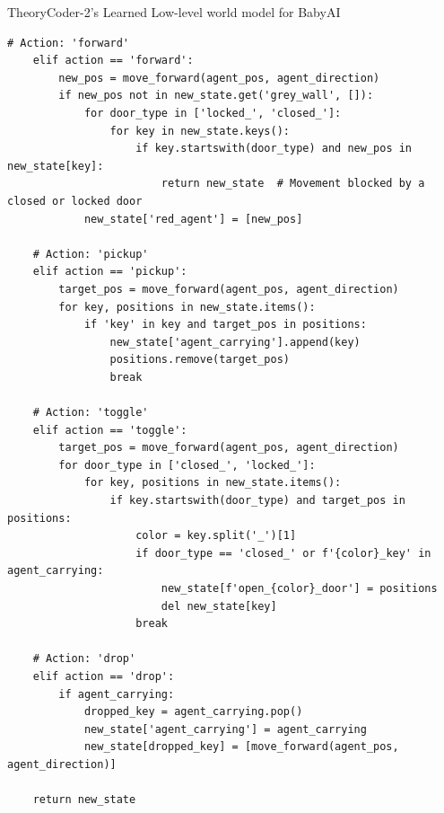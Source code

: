 \documentclass{article}
\theoremstyle{plain}
\theoremstyle{definition}
\theoremstyle{remark}
\begin{document}
\begin{mybox}[boxrule=0pt, parbox=false, opacityframe=1, colframe=black, label=box:tc2_babyai_lowlevel_wm]{TheoryCoder-2's Learned Low-level world model for BabyAI}
\begin{lstlisting}[basicstyle=\ttfamily\small, breaklines=true]
    # Action: 'forward'
    elif action == 'forward':
        new_pos = move_forward(agent_pos, agent_direction)
        if new_pos not in new_state.get('grey_wall', []):
            for door_type in ['locked_', 'closed_']:
                for key in new_state.keys():
                    if key.startswith(door_type) and new_pos in new_state[key]:
                        return new_state  # Movement blocked by a closed or locked door
            new_state['red_agent'] = [new_pos]

    # Action: 'pickup'
    elif action == 'pickup':
        target_pos = move_forward(agent_pos, agent_direction)
        for key, positions in new_state.items():
            if 'key' in key and target_pos in positions:
                new_state['agent_carrying'].append(key)
                positions.remove(target_pos)
                break
    
    # Action: 'toggle'
    elif action == 'toggle':
        target_pos = move_forward(agent_pos, agent_direction)
        for door_type in ['closed_', 'locked_']:
            for key, positions in new_state.items():
                if key.startswith(door_type) and target_pos in positions:
                    color = key.split('_')[1]
                    if door_type == 'closed_' or f'{color}_key' in agent_carrying:
                        new_state[f'open_{color}_door'] = positions
                        del new_state[key]
                    break
    
    # Action: 'drop'
    elif action == 'drop':
        if agent_carrying:
            dropped_key = agent_carrying.pop()
            new_state['agent_carrying'] = agent_carrying
            new_state[dropped_key] = [move_forward(agent_pos, agent_direction)]
    
    return new_state
\end{lstlisting}

\end{mybox}



\end{document}
